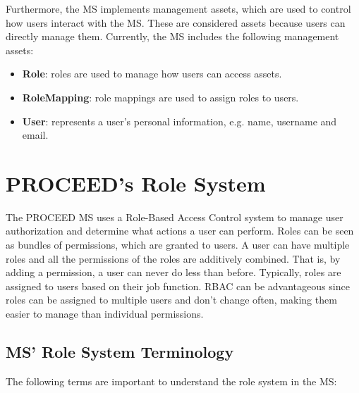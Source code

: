 Furthermore, the MS implements management assets, which are used to control how users interact with the MS.
These are considered assets because users can directly manage them.
Currently, the MS includes the following management assets:

\begin{itemize}
  \item \textbf{Role}: roles are used to manage how users can access assets.
  \item \textbf{RoleMapping}: role mappings are used to assign roles to users.
  \item \textbf{User}: represents a user's personal information, e.g. name, username and email.
\end{itemize}


\section{PROCEED's Role System}
\label{cha:relatedwork:proceedroles}

The PROCEED MS uses a Role-Based Access Control %
system to manage user authorization and determine what actions a user can perform.
Roles can be seen as bundles of permissions, which are granted to users.
A user can have multiple roles and all the permissions of the roles are additively
combined. That is, by adding a permission, a user can never do less than before.
Typically, roles are assigned to users based on their job function.
RBAC can be advantageous since roles can be assigned to multiple users and
don't change often, making them easier to manage than individual permissions.

\subsection{MS' Role System Terminology}
\label{cha:relatedwork:proceedroles:terminology}

The following terms are important to understand the role system in the MS:

